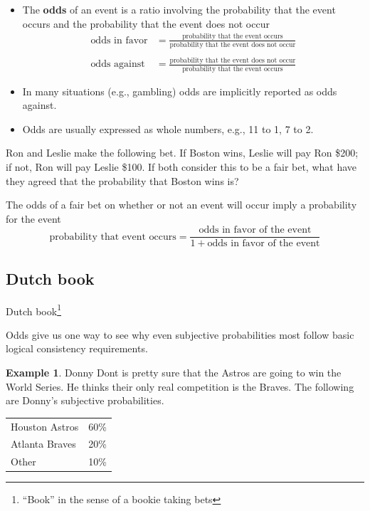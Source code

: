 \documentclass[
]{book}
\providecommand{\tightlist}{%
  \setlength{\itemsep}{0pt}\setlength{\parskip}{0pt}}
\theoremstyle{definition}
\theoremstyle{definition}
\newtheorem{example}{Example}[chapter]
\theoremstyle{definition}
\theoremstyle{remark}
\begin{document}
\begin{itemize}
\tightlist
\item
  The \textbf{odds} of an event is a ratio involving the probability that the
  event occurs and the probability that the event does not occur
  \[
  \begin{aligned}
  \text{odds in favor} & = \frac{\text{probability that the event occurs}}{\text{probability that the event does not occur}} \\
  & \\
  \text{odds against} & = \frac{\text{probability that the event does not occur}}{\text{probability that the event  occurs}}\end{aligned}
  \]
\item
  In many situations (e.g., gambling) odds are implicitly reported as odds against.
\item
  Odds are usually expressed as whole numbers, e.g., 11 to 1, 7 to 2.
\end{itemize}

Ron and Leslie make the following bet. If Boston wins, Leslie will pay
Ron \$200; if not, Ron will pay Leslie \$100. If both consider this to
be a fair bet, what have they agreed that the probability that Boston
wins is?

The odds of a fair bet on whether or not an event will occur imply a
probability for the event
\[\text{probability that event occurs} = \frac{\text{odds in favor of the event}}{1+\text{odds in favor of the event}}\]

\hypertarget{dutch-book}{%
\subsection{Dutch book}\label{dutch-book}}

Dutch book\footnote{``Book'' in the sense of a bookie taking bets}

Odds give us one way to see why even subjective probabilities most follow basic logical consistency requirements.

\begin{example}
\protect\hypertarget{exm:dutch}{}{\label{exm:dutch} }
Donny Dont is pretty sure that the Astros are going to win the World Series. He thinks their only real competition is the Braves. The following are Donny's subjective probabilities.

\begin{longtable}[]{@{}lr@{}}
\toprule
\endhead
Houston Astros & 60\%\tabularnewline
Atlanta Braves & 20\%\tabularnewline
Other & 10\%\tabularnewline
\bottomrule
\end{longtable}
\end{example}
\end{document}
